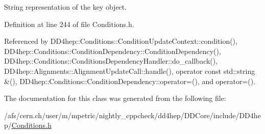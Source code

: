 String representation of the key object. 

Definition at line 244 of file Conditions.h.

Referenced by DD4hep::Conditions::ConditionUpdateContext::condition(), DD4hep::Conditions::ConditionDependency::ConditionDependency(), DD4hep::Conditions::ConditionsDependencyHandler::do\_\-callback(), DD4hep::Alignments::AlignmentUpdateCall::handle(), operator const std::string \&(), DD4hep::Conditions::ConditionDependency::operator=(), and operator=().

The documentation for this class was generated from the following file:\begin{DoxyCompactItemize}
\item 
/afs/cern.ch/user/m/mpetric/nightly\_\-cppcheck/dd4hep/DDCore/include/DD4hep/\hyperlink{_conditions_8h}{Conditions.h}\end{DoxyCompactItemize}
